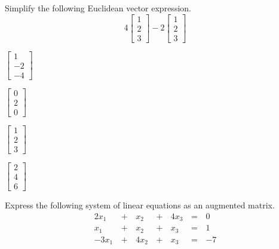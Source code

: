 \documentclass{article}
\begin{document}
\begin{readinessAssuranceTest}
\setcounter{enumi}{20}
\item Simplify the following Euclidean vector expression.
$$4
  \begin{bmatrix}
    1 \\ 2 \\ 3
  \end{bmatrix}-
  2
  \begin{bmatrix}
    1 \\ 2 \\ 3
  \end{bmatrix}$$


\begin{multicols}{4}
\begin{readinessAssuranceTestChoices}
\item \(
        \begin{bmatrix}
          1 \\ -2 \\ -4
        \end{bmatrix}
      \)
\item \(
        \begin{bmatrix}
          0 \\ 2 \\ 0
        \end{bmatrix}
      \)
\item \(
        \begin{bmatrix}
          1 \\ 2 \\ 3
        \end{bmatrix}
      \)
\item \(
        \begin{bmatrix}
          2 \\ 4 \\ 6
        \end{bmatrix}
      \) %

\end{readinessAssuranceTestChoices}
\end{multicols}




\item Express the following system of linear equations as an augmented matrix.
\begin{alignat*}{4}
  2x_1 &\,+\,& x_2 &\,+\,& 4x_3 &\,=\,& 0 \\
   x_1 &\,+\,& x_2 &\,+\,&  x_3 &\,=\,& 1 \\
 -3x_1 &\,+\,& 4x_2 &\,+\,& x_3 &\,=\,& -7 \\
\end{alignat*}


\end{readinessAssuranceTest}
\end{document}
